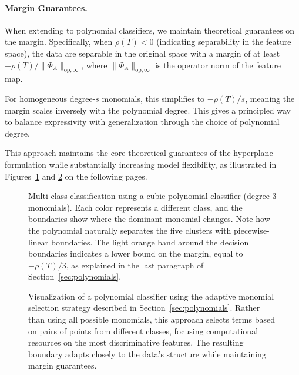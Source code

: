 \documentclass{article}
\begin{document}
\paragraph{Margin Guarantees.}
When extending to polynomial classifiers, we maintain theoretical guarantees on the margin. Specifically, when $\rho(T)<0$ (indicating separability in the feature space), the data are separable in the original space with a margin of at least $-\rho(T)/\lVert \Phi_A\rVert_{\text{op},\infty}$, where $\lVert \Phi_A\rVert_{\text{op},\infty}$ is the operator norm of the feature map.

For homogeneous degree-$s$ monomials, this simplifies to $-\rho(T)/s$, meaning the margin scales inversely with the polynomial degree. This gives a principled way to balance expressivity with generalization through the choice of polynomial degree.

This approach maintains the core theoretical guarantees of the hyperplane formulation while substantially increasing model flexibility, as illustrated in Figures~\ref{fig:homogeneous_selection} and \ref{fig:adaptive_polynomial} on the following pages.

\newpage

\vspace*{3em}
\begin{figure}[ht!]
    \centering
    \resizebox{0.8\textwidth}{!}{\clipbox{0.15\width{} 0.30\height{} 0.15\width{} 0.30\height{}}{}}
    \caption{Multi-class classification using a cubic polynomial classifier (degree-3 monomials). Each color represents a different class, and the boundaries show where the dominant monomial changes. Note how the polynomial naturally separates the five clusters with piecewise-linear boundaries. The light orange band around the decision boundaries indicates a lower bound on the margin, equal to $-\rho(T)/3$, as explained in the last paragraph of Section~\ref{sec:polynomials}.}
    \label{fig:homogeneous_selection}
\end{figure}
\vspace*{4em}
\begin{figure}[ht!]
    \centering
    \resizebox{0.8\textwidth}{!}{\clipbox{0.15\width{} 0.30\height{} 0.15\width{} 0.30\height{}}{}}
    \caption{Visualization of a polynomial classifier using the adaptive monomial selection strategy described in Section~\ref{sec:polynomials}. Rather than using all possible monomials, this approach selects terms based on pairs of points from different classes, focusing computational resources on the most discriminative features. The resulting boundary adapts closely to the data's structure while maintaining margin guarantees.}
    \label{fig:adaptive_polynomial}
\end{figure}
\vspace*{3em}
\end{document}
